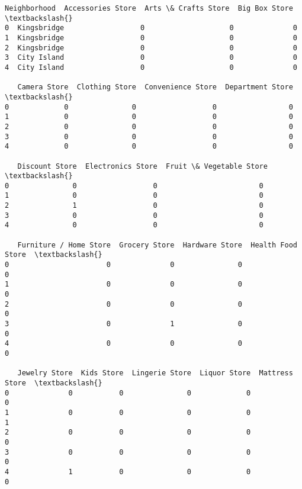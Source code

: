 \documentclass[11pt]{article}
\makeatletter
\newcommand{\boxspacing}{\kern\kvtcb@left@rule\kern\kvtcb@boxsep}
\newcommand{\prompt}[4]{
        \ttfamily\llap{{\color{#2}[#3]:\hspace{3pt}#4}}\vspace{-\baselineskip}
    }
\makeatother
\begin{document}
            \begin{tcolorbox}[breakable, size=fbox, boxrule=.5pt, pad at break*=1mm, opacityfill=0]
\prompt{Out}{outcolor}{29}{\boxspacing}
\begin{Verbatim}[commandchars=\\\{\}]
  Neighborhood  Accessories Store  Arts \& Crafts Store  Big Box Store  \textbackslash{}
0  Kingsbridge                  0                    0              0
1  Kingsbridge                  0                    0              0
2  Kingsbridge                  0                    0              0
3  City Island                  0                    0              0
4  City Island                  0                    0              0

   Camera Store  Clothing Store  Convenience Store  Department Store  \textbackslash{}
0             0               0                  0                 0
1             0               0                  0                 0
2             0               0                  0                 0
3             0               0                  0                 0
4             0               0                  0                 0

   Discount Store  Electronics Store  Fruit \& Vegetable Store  \textbackslash{}
0               0                  0                        0
1               0                  0                        0
2               1                  0                        0
3               0                  0                        0
4               0                  0                        0

   Furniture / Home Store  Grocery Store  Hardware Store  Health Food Store  \textbackslash{}
0                       0              0               0                  0
1                       0              0               0                  0
2                       0              0               0                  0
3                       0              1               0                  0
4                       0              0               0                  0

   Jewelry Store  Kids Store  Lingerie Store  Liquor Store  Mattress Store  \textbackslash{}
0              0           0               0             0               0
1              0           0               0             0               1
2              0           0               0             0               0
3              0           0               0             0               0
4              1           0               0             0               0


\end{Verbatim}
\end{tcolorbox}
\end{document}
